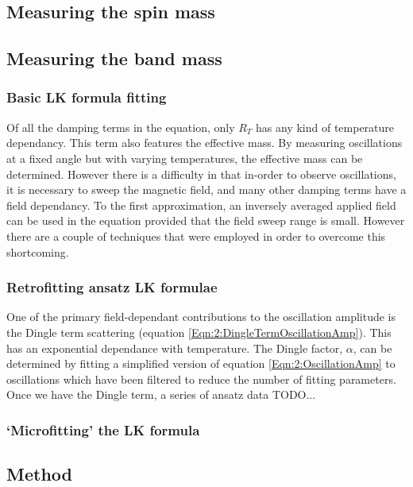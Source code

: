 \subsection{Measuring the spin mass}

\subsection{Measuring the band mass}

\subsubsection{Basic LK formula fitting}

Of all the damping terms in the \LK equation, only $R_T$ has any kind of temperature dependancy. This term also features the effective mass. By measuring oscillations at a fixed angle but with varying temperatures, the effective mass can be determined. However there is a difficulty in that in-order to observe oscillations, it is necessary to sweep the magnetic field, and many other damping terms have a field dependancy. To the first approximation, an inversely averaged applied field can be used in the \LK equation provided that the field sweep range is small. However there are a couple of techniques that were employed in order to overcome this shortcoming.

\subsubsection{Retrofitting ansatz LK formulae}
\label{Sec:2:LKRetrofitting}

One of the primary field-dependant contributions to the oscillation amplitude is the Dingle term scattering (equation \ref{Eqn:2:DingleTermOscillationAmp}). This has an exponential dependance with temperature. The Dingle factor, $\alpha$, can be determined by fitting a simplified version of equation \ref{Eqn:2:OscillationAmp} to oscillations which have been filtered to reduce the number of fitting parameters. Once we have the Dingle term, a series of ansatz data TODO...




\subsubsection{`Microfitting' the LK formula}
\label{Sec:2:LKMicrofitting}

\subsection{Method}


